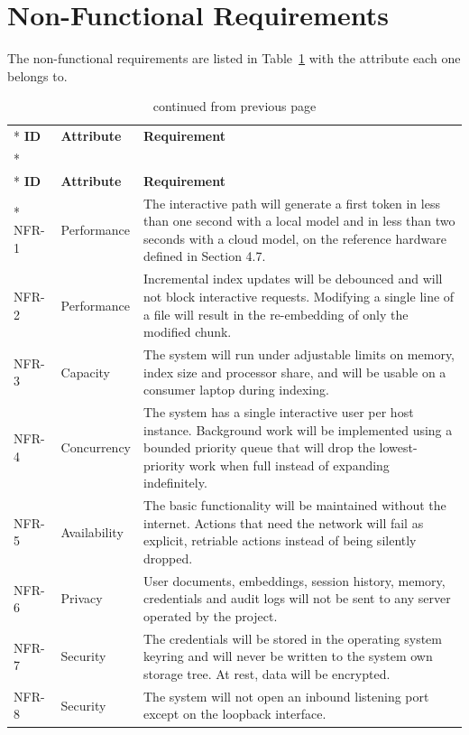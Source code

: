 \documentclass{FastFyp}
\begin{document}
\section{Non-Functional Requirements}
The non-functional requirements are listed in Table~\ref{tab:nfr} with the attribute each one belongs to.

{\small
{}
\begin{longtable}{|p{1.5cm}|p{2.5cm}|p{10.0cm}|}
\caption{Non-functional requirements.}\label{tab:nfr}\\*
\hline
\textbf{ID} & \textbf{Attribute} & \textbf{Requirement} \\*
\hline
\endfirsthead
\caption[]{continued from previous page}\\*
\hline
\textbf{ID} & \textbf{Attribute} & \textbf{Requirement} \\*
\hline
\endhead
NFR-1 & Performance & The interactive path will generate a first token in less than one second with a local model and in less than two seconds with a cloud model, on the reference hardware defined in Section 4.7. \\
\hline
NFR-2 & Performance & Incremental index updates will be debounced and will not block interactive requests. Modifying a single line of a file will result in the re-embedding of only the modified chunk. \\
\hline
NFR-3 & Capacity & The system will run under adjustable limits on memory, index size and processor share, and will be usable on a consumer laptop during indexing. \\
\hline
NFR-4 & Concurrency & The system has a single interactive user per host instance. Background work will be implemented using a bounded priority queue that will drop the lowest-priority work when full instead of expanding indefinitely. \\
\hline
NFR-5 & Availability & The basic functionality will be maintained without the internet. Actions that need the network will fail as explicit, retriable actions instead of being silently dropped. \\
\hline
NFR-6 & Privacy & User documents, embeddings, session history, memory, credentials and audit logs will not be sent to any server operated by the project. \\
\hline
NFR-7 & Security & The credentials will be stored in the operating system keyring and will never be written to the system own storage tree. At rest, data will be encrypted. \\
\hline
NFR-8 & Security & The system will not open an inbound listening port except on the loopback interface. \\

\end{longtable}}
\end{document}
